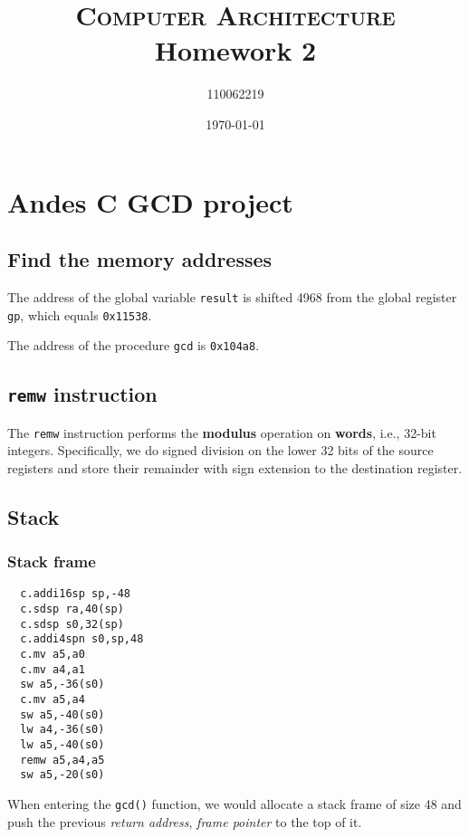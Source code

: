 \documentclass[12pt, a4paper]{article}
\title{\textsc{Computer Architecture} Homework 2}
\author{110062219}
\date{\today}
\begin{document}
\maketitle

\tableofcontents

\section{Andes C GCD project}

\subsection{Find the memory addresses}

The address of the global variable \texttt{result} is shifted 4968 from the global register \texttt{gp}, which equals \texttt{0x11538}.

The address of the procedure \texttt{gcd} is \texttt{0x104a8}.

\subsection{\texttt{remw} instruction}

The \texttt{remw} instruction performs the \textbf{modulus} operation on \textbf{words}, i.e., 32-bit integers. Specifically, we do signed division on the lower 32 bits of the source registers and store their remainder with sign extension to the destination register.

\subsection{Stack}

\subsubsection{Stack frame}

\begin{verbatim}
  c.addi16sp sp,-48
  c.sdsp ra,40(sp)
  c.sdsp s0,32(sp)
  c.addi4spn s0,sp,48
  c.mv a5,a0
  c.mv a4,a1
  sw a5,-36(s0)
  c.mv a5,a4
  sw a5,-40(s0)
  lw a4,-36(s0)
  lw a5,-40(s0)
  remw a5,a4,a5
  sw a5,-20(s0)
\end{verbatim}

When entering the \texttt{gcd()} function, we would allocate a stack frame of size 48 and push the previous \textit{return address}, \textit{frame pointer} to the top of it.
\end{document}
